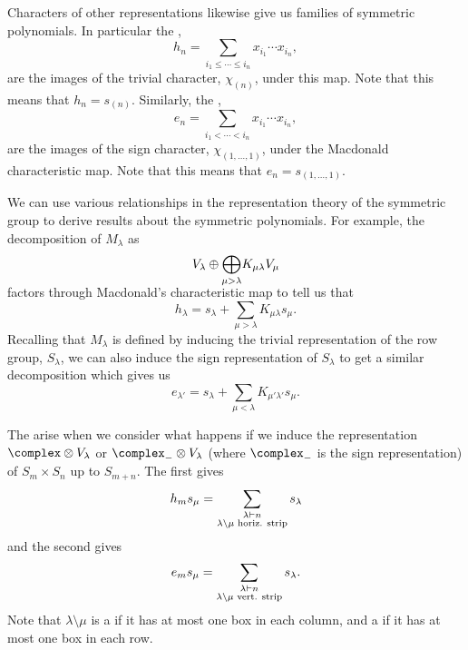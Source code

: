 Characters of other representations likewise give us families of symmetric polynomials.
In particular the ,
\begin{equation}
    h_n = \sum_{i_1 \le \dotsb \le i_n} x_{i_1} \dotsm x_{i_n},
\end{equation}
are the images of the trivial character, \(\chi_{(n)}\), under this map.
Note that this means that \(h_n = s_{(n)}\).
Similarly, the ,
\begin{equation}
    e_n = \sum_{i_1 < \dotsb < i_n} x_{i_1} \dotsm x_{i_n},
\end{equation}
are the images of the sign character, \(\chi_{(1, \dotsc, 1)}\), under the Macdonald characteristic map.
Note that this means that \(e_n = s_{(1, \dotsc, 1)}\).

We can use various relationships in the representation theory of the symmetric group to derive results about the symmetric polynomials.
For example, the decomposition of \(M_\lambda\) as
\begin{equation}
    V_\lambda \oplus \vphantom{\bigoplus}\smash{\bigoplus_{\mu > \lambda}} K_{\mu\lambda} V_\mu
\end{equation}
factors through Macdonald's characteristic map to tell us that
\begin{equation}
    h_\lambda = s_\lambda + \sum_{\mu > \lambda} K_{\mu\lambda}s_\mu.
\end{equation}
Recalling that \(M_\lambda\) is defined by inducing the trivial representation of the row group, \(S_\lambda\), we can also induce the sign representation of \(S_\lambda\) to get a similar decomposition which gives us
\begin{equation}
    e_{\lambda'} = s_{\lambda} + \sum_{\mu < \lambda} K_{\mu' \lambda'} s_\mu.
\end{equation}

The  arise when we consider what happens if we induce the representation \(\complex \otimes V_\lambda\) or \(\complex_{-} \otimes V_\lambda\) (where \(\complex_{-}\) is the sign representation) of \(S_m \times S_n\) up to \(S_{m+n}\).
The first gives
\begin{equation}
    h_m s_\mu = \sum_{\substack{\lambda \vdash n\\ \lambda \setminus \mu \text{ horiz. strip}}} s_\lambda
\end{equation}
and the second gives
\begin{equation}
    e_m s_\mu =  \sum_{\substack{\lambda \vdash n\\ \lambda \setminus \mu \text{ vert. strip}}} s_\lambda.
\end{equation}
Note that \(\lambda \setminus \mu\) is a  if it has at most one box in each column, and a  if it has at most one box in each row.

